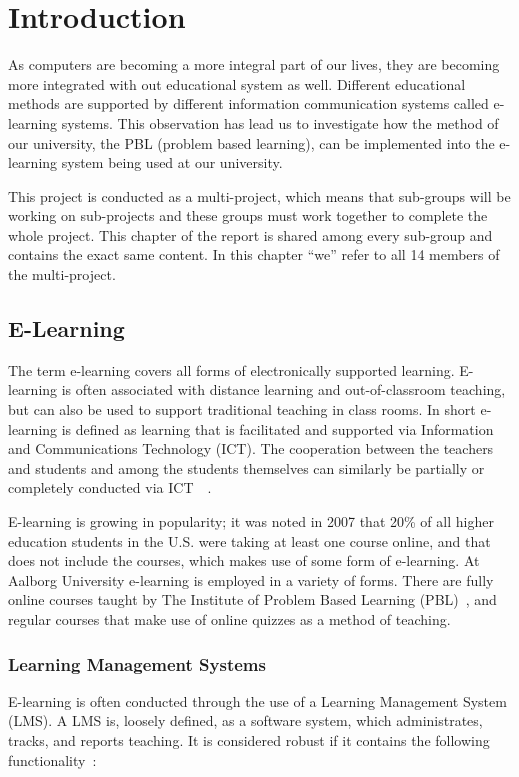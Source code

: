 \chapter{Introduction}
As computers are becoming a more integral part of our lives, they are becoming more integrated with out educational system as well.
Different educational methods are supported by different information communication systems called e-learning systems.
This observation has lead us to investigate how the method of our university, the PBL (problem based learning), can be implemented into the e-learning system being used at our university.

This project is conducted as a multi-project, which means that sub-groups will be working on sub-projects and these groups must work together to complete the whole project.
This chapter of the report is shared among every sub-group and contains the exact same content.
In this chapter ``we'' refer to all 14 members of the multi-project.

\section{E-Learning}
\label{sec:e-learning}
The term e-learning covers all forms of electronically supported learning. 
E-learning is often associated with distance learning and out-of-classroom teaching, but can also be used to support traditional teaching in class rooms. 
In short e-learning is defined as learning that is facilitated and supported via Information and Communications Technology (ICT). 
The cooperation between the teachers and students and among the students themselves can similarly be partially or completely conducted via ICT~\cite{def-e-learning1}~\cite{def-e-learning2}.

E-learning is growing in popularity; it was noted in 2007 that 20\% of all higher education students in the U.S. were taking at least one course online, and that does not include the courses, which makes use of some form of e-learning.	
At Aalborg University e-learning is employed in a variety of forms. 
There are fully online courses taught by The Institute of Problem Based Learning (PBL)~\cite{mpbl}, and regular courses that make use of online quizzes as a method of teaching.

\subsection{Learning Management Systems}
\label{sub:lms}
E-learning is often conducted through the use of a Learning Management System (LMS). 
A LMS is, loosely defined, as a software system, which administrates, tracks, and reports teaching. 
It is considered robust if it contains the following functionality~\citep{Ellis09}:


